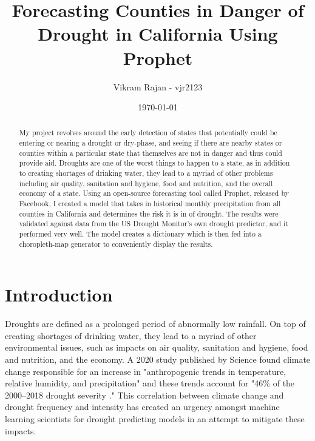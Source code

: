 \documentclass{article}
\begin{document}
\title{\textbf{Forecasting Counties in Danger of Drought in California Using Prophet}}
\date{\today}
\author{Vikram Rajan - vjr2123}

\maketitle

\begin{abstract}
    My project revolves around the early detection of states that potentially could be entering or nearing a drought or dry-phase, and seeing if there are nearby states or counties within a particular state that themselves are not in danger and thus could provide aid. Droughts are one of the worst things to happen to a state, as in addition to creating shortages of drinking water, they lead to a myriad of other problems including air quality, sanitation and hygiene, food and nutrition, and the overall economy of a state. Using an open-source forecasting tool called Prophet, released by Facebook, I created a model that takes in historical monthly precipitation from all counties in California and determines the risk it is in of drought. The results were validated against data from the US Drought Monitor's own drought predictor, and it performed very well. The model creates a dictionary which is then fed into a choropleth-map generator to conveniently display the results. 

\end{abstract}


\section{Introduction}
Droughts are defined as a prolonged period of abnormally low rainfall. On top of creating shortages of drinking water, they lead to a myriad of other environmental issues, such as impacts on air quality, sanitation and hygiene, food and nutrition, and the economy. A 2020 study published by Science found climate change responsible for an increase in "anthropogenic trends in temperature, relative humidity, and precipitation" and  these trends account for "46\% of the 2000–2018 drought severity \cite{Science}." This correlation between climate change and drought frequency and intensity has created an urgency amongst machine learning scientists for drought predicting models in an attempt to mitigate these impacts. 
\end{document}
